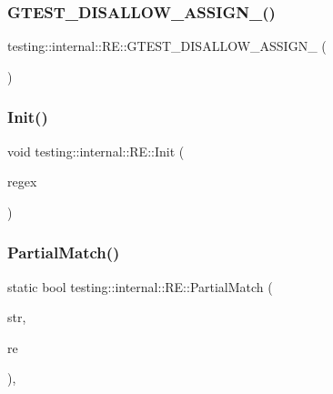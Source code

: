 \subsubsection{\texorpdfstring{G\+T\+E\+S\+T\+\_\+\+D\+I\+S\+A\+L\+L\+O\+W\+\_\+\+A\+S\+S\+I\+G\+N\+\_\+()}{GTEST\_DISALLOW\_ASSIGN\_()}}
{\footnotesize\ttfamily testing\+::internal\+::\+R\+E\+::\+G\+T\+E\+S\+T\+\_\+\+D\+I\+S\+A\+L\+L\+O\+W\+\_\+\+A\+S\+S\+I\+G\+N\+\_\+ (\begin{DoxyParamCaption}\item[{\hyperlink{classtesting_1_1internal_1_1RE}{RE}}]{ }\end{DoxyParamCaption})\hspace{0.3cm}{\ttfamily [private]}}

\mbox{\label{classtesting_1_1internal_1_1RE_a4c3a519ce849abc57d6d5fffbf1e04dc}} 
\subsubsection{\texorpdfstring{Init()}{Init()}}
{\footnotesize\ttfamily void testing\+::internal\+::\+R\+E\+::\+Init (\begin{DoxyParamCaption}\item[{const char $\ast$}]{regex }\end{DoxyParamCaption})\hspace{0.3cm}{\ttfamily [private]}}

\mbox{\label{classtesting_1_1internal_1_1RE_a1e81f9a87211bdca645e025f8f0236c8}} 
\subsubsection{\texorpdfstring{Partial\+Match()}{PartialMatch()}\hspace{0.1cm}{\footnotesize\ttfamily [1/2]}}
{\footnotesize\ttfamily static bool testing\+::internal\+::\+R\+E\+::\+Partial\+Match (\begin{DoxyParamCaption}\item[{const \+::std\+::string \&}]{str,  }\item[{const \hyperlink{classtesting_1_1internal_1_1RE}{RE} \&}]{re }\end{DoxyParamCaption})\hspace{0.3cm}{\ttfamily [inline]}, {\ttfamily [static]}}

